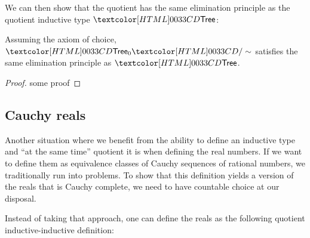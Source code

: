 We can then show that the quotient has the same elimination principle
as the quotient inductive type $\treety$:

\begin{proposition}
  Assuming the axiom of choice, $\quotty{\pretreety}{\treerel}$
  satisfies the same elimination principle as $\treety$.
\end{proposition}

\begin{proof}
  some proof
\end{proof}

\subsection{Cauchy reals}

Another situation where we benefit from the ability to define an
inductive type and ``at the same time'' quotient it is when defining
the real numbers. If we want to define them as equivalence classes of
Cauchy sequences of rational numbers, we traditionally run into
problems. To show that this definition yields a version of the reals
that is Cauchy complete, we need to have countable choice at our
disposal.

Instead of taking that approach, one can define the reals as the
following quotient inductive-inductive definition:

\begin{sorts}
  \sortnamety{\realty}{\Set} \\
  \sortnamety{\realrel{\_}{\_}}{\realty \to \realty \to \Set}
\end{sorts}

\begin{datatype}{\realty}{}
  \constrdots
\end{datatype}

\begin{datatype}{\realrel{\_}{\_}}{}
  \constrdots
\end{datatype}

